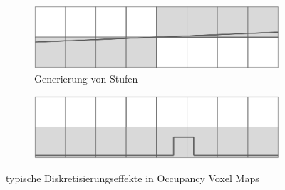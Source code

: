 \mbox{}
\begin{figure}[ht]
  \begin{subfigure}[t]{.5\textwidth}
    \centering
    \includegraphics[width=.9\linewidth]{pic/loesungen/12a_steps.png}
    \caption{Generierung von Stufen}
    \label{fig:s_12steps}
  \end{subfigure}\hfill
  \begin{subfigure}[t]{.5\textwidth}
    \centering
    \includegraphics[width=.9\linewidth]{pic/loesungen/12b_bumps.png}
    \caption{}
    \label{fig:s_12bumps}
  \end{subfigure}
  \caption{typische Diskretisierungseffekte in Occupancy Voxel Maps \cite{3DsurfelGridMaps}}
  \label{fig:discretization_effects}
\end{figure}
\mbox{}

\newpage
